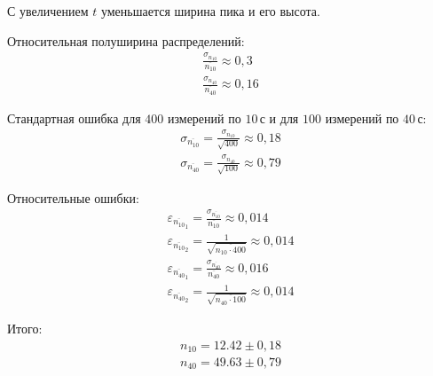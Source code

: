С увеличением $t$ уменьшается ширина пика и его высота.

Относительная полуширина распределений:
\begin{displaymath}
\begin{split}
    \frac{\sigma_{n_{10}}}{\overline{n_{10}}}\approx 0{,}3 \\
    \frac{\sigma_{n_{40}}}{\overline{n_{40}}}\approx 0{,}16
\end{split}
\end{displaymath}

Стандартная ошибка для $400$ измерений по $10\,\text{с}$ и
для $100$ измерений по $40\,\text{с}$:
\begin{displaymath}
\begin{split}
    \sigma_{\overline{n_{10}}}=\frac{\sigma_{n_{10}}}{\sqrt{400}}\approx 0{,}18 \\
    \sigma_{\overline{n_{40}}}=\frac{\sigma_{n_{40}}}{\sqrt{100}}\approx 0{,}79
\end{split}
\end{displaymath}

Относительные ошибки:
\begin{displaymath}
\begin{split}
    \varepsilon_{\overline{n_{10}}_1} = \frac{\sigma_{\overline{n_{10}}}}{\overline{n_{10}}}\approx 0{,}014 \\
    \varepsilon_{\overline{n_{10}}_2} = \frac{1}{\sqrt{\overline{n_{10}\cdot 400}}}\approx 0{,}014 \\
    \varepsilon_{\overline{n_{40}}_1} = \frac{\sigma_{\overline{n_{40}}}}{\overline{n_{40}}}\approx 0{,}016 \\
    \varepsilon_{\overline{n_{40}}_2} = \frac{1}{\sqrt{\overline{n_{40}\cdot 100}}}\approx 0{,}014
\end{split}
\end{displaymath}

Итого:
\begin{displaymath}
\begin{split}
    n_{10}=12{.}42\pm 0{,}18 \\
    n_{40}=49{.}63\pm 0{,}79
\end{split}
\end{displaymath}


